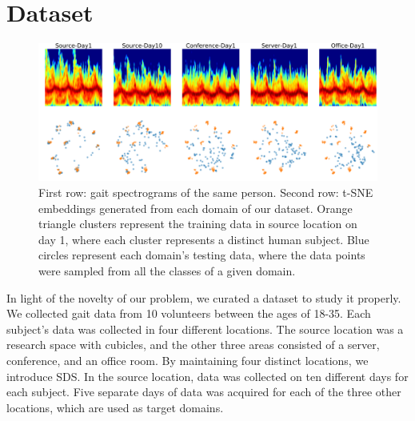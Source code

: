 \documentclass{article}
\begin{document}
\section{Dataset}

\begin{figure}[ht]
\includegraphics[width=1.0\linewidth]{figures/Exp0.png} 
\caption{First row: gait spectrograms of the same person. Second row: t-SNE embeddings generated from each domain of our dataset. Orange triangle clusters represent the training data in source location on day 1, where each cluster represents a distinct human subject. Blue circles represent each domain's testing data, where the data points were sampled from all the classes of a given domain.}
\label{specs}
\end{figure}

In light of the novelty of our problem, we curated a dataset to study it properly. We collected gait data from 10 volunteers between the ages of 18-35. Each subject's data was collected in four different locations. The source location was a research space with cubicles, and the other three areas consisted of a server, conference, and an office room. By maintaining four distinct locations, we introduce SDS. In the source location, data was collected on ten different days for each subject. Five separate days of data was acquired for each of the three other locations, which are used as target domains.
\end{document}
